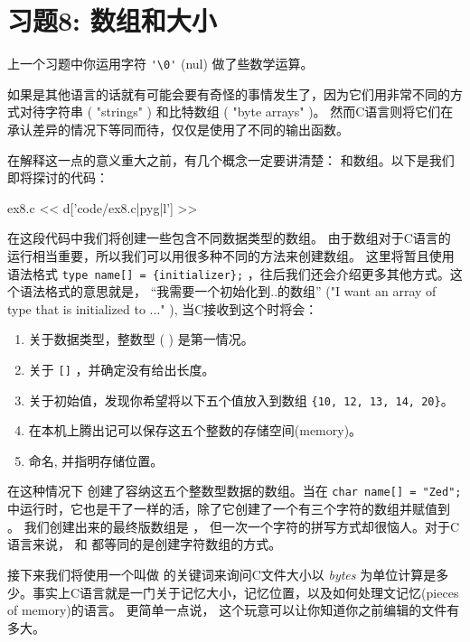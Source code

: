\chapter{习题8: 数组和大小}

上一个习题中你运用字符 \verb|'\0'| (nul) 做了些数学运算。

如果是其他语言的话就有可能会要有奇怪的事情发生了，因为它们用非常不同的方式对待字符串 ( "strings" ) 和比特数组 ( "byte arrays" )。 然而C语言则将它们在承认差异的情况下等同而待，仅仅是使用了不同的输出函数。

在解释这一点的意义重大之前，有几个概念一定要讲清楚：  和数组。以下是我们即将探讨的代码：

\begin{code}{ex8.c}
<< d['code/ex8.c|pyg|l'] >>
\end{code}

在这段代码中我们将创建一些包含不同数据类型的数组。 由于数组对于C语言的运行相当重要，所以我们可以用很多种不同的方法来创建数组。 这里将暂且使用语法格式 \verb|type name[] = {initializer};| ，往后我们还会介绍更多其他方式。这个语法格式的意思就是， “我需要一个初始化到{..}的数组” ("I want an array of
type that is initialized to {..}." ), 当C接收到这个时将会： 

\begin{enumerate}
\item 关于数据类型，整数型 (  ) 是第一情况。
\item 关于 \verb|[]| ，并确定没有给出长度。
\item 关于初始值，发现你希望将以下五个值放入到数组 \verb|{10, 12, 13, 14, 20}|。
\item 在本机上腾出记可以保存这五个整数的存储空间(memory)。
\item 命名,  并指明存储位置。
\end{enumerate}


在这种情况下  创建了容纳这五个整数型数据的数组。当在 \verb|char name[] = "Zed";|中运行时，它也是干了一样的活，除了它创建了一个有三个字符的数组并赋值到 。 我们创建出来的最终版数组是 ， 但一次一个字符的拼写方式却很恼人。对于C语言来说，  和  都等同的是创建字符数组的方式。

接下来我们将使用一个叫做  的关键词来询问C文件大小以 \emph{bytes} 为单位计算是多少。事实上C语言就是一门关于记忆大小，记忆位置，以及如何处理文记忆(pieces of memory)的语言。 更简单一点说， 这个玩意可以让你知道你之前编辑的文件有多大。

